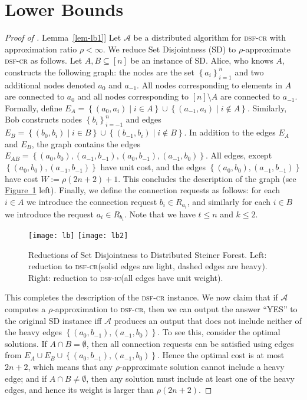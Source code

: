 \documentclass[letterpaper,11pt]{article}
\newcommand{\namedref}[2]{\hyperref[#2]{#1~\ref*{#2}}}
\newcommand{\figureref}[1]{\namedref{Figure}{#1}}
\newcommand{\lemmaref}[1]{\namedref{Lemma}{#1}}
\newcommand{\Set}[1]{\left\{#1\right\}}
\def\cA{\mathcal{A}}
\newcommand{\sfcr}{\textsc{dsf-cr}\xspace}
\newcommand{\sfic}{\textsc{dsf-ic}\xspace}
\begin{document}
\section{Lower Bounds}
\label{app-lb}
\begin{proof}[Proof of \lemmaref{lem-lb1}]
Let $\cA$ be a distributed algorithm for \sfcr with approximation
ratio $\rho<\infty$. 
We reduce Set Disjointness (SD) to $\rho$-approximate \sfcr as follows.
Let $A,B\subseteq[n]$ be an instance of SD. Alice, who knows $A$,
constructs the following graph: the nodes are the set
$\Set{a_i}_{i=1}^n$ and two additional nodes denoted $a_0$ and
$a_{-1}$. 
All nodes corresponding to elements in $A$ are connected to $a_0$ and
all nodes corresponding to $[n]\setminus A$ are connected to
$a_{-1}$. Formally, define $E_A=\Set{(a_0,a_i)\mid i\in
  A}\cup\Set{(a_{-1},a_i)\mid i\notin A}$.
Similarly, Bob  constructs nodes $\Set{b_i}_{i=-1}^n$ and edges 
$E_B=\Set{(b_0,b_i)\mid i\in B}\cup\Set{(b_{-1},b_i)\mid i\notin B}$.
In addition to the edges $E_A$ and $E_B$, the graph contains the edges
$E_{AB}=\Set{(a_0,b_0),(a_{-1},b_{-1}),(a_0,b_{-1}),(a_{-1},b_0)}$. 
All edges, except $\Set{(a_0,b_{0}),(a_{-1},b_{-1})}$ have unit cost,
and the edges $\Set{(a_0,b_{0}),(a_{-1},b_{-1})}$ have cost
$W:=\rho(2 n+2)+1$.
This concludes the description of the graph (see \figureref{fig-lb} left). 
Finally, we define the
connection requests 
as follows: for each $i\in A$ we introduce the connection request
$b_i\in R_{a_i}$, and similarly for each $i\in B$ we introduce the
request $a_i\in R_{b_i}$. Note that we have $t\le n$ and $k\le 2$.

\begin{figure}[t]
  \centering
  \texttt{[image: lb]}\hspace*{15mm}
  \texttt{[image: lb2]}
  \caption{\small Reductions of Set Disjointness to Distributed Steiner
    Forest. Left: reduction to \sfcr (solid edges are light, dashed
    edges are heavy). Right: reduction to \sfic (all edges have unit weight).} 
  \label{fig-lb}
\end{figure}
This completes the description of the \sfcr instance. We now claim
that if $\cA$ computes a $\rho$-approxima\-tion to \sfcr, then we can output
the answer ``YES'' to
the original SD instance iff $\cA$ produces an output that does not
include neither of the heavy edges
$\Set{(a_0,b_{-1}),(a_{-1},b_0)}$. To see this, consider the optimal
solutions. If $A\cap B=\emptyset$, then all connection requests can be
satisfied using edges from $E_A\cup
E_B\cup\Set{(a_0,b_{-1}),(a_{-1},b_0)}$. Hence the optimal cost is at most
$2n+2$, which means that any $\rho$-approximate solution cannot include
a heavy edge; and if $A\cap B\ne\emptyset$, then any solution must
include at least one of the
heavy edges, and hence its weight is larger than $\rho(2n+2)$.


\end{proof}
\end{document}
